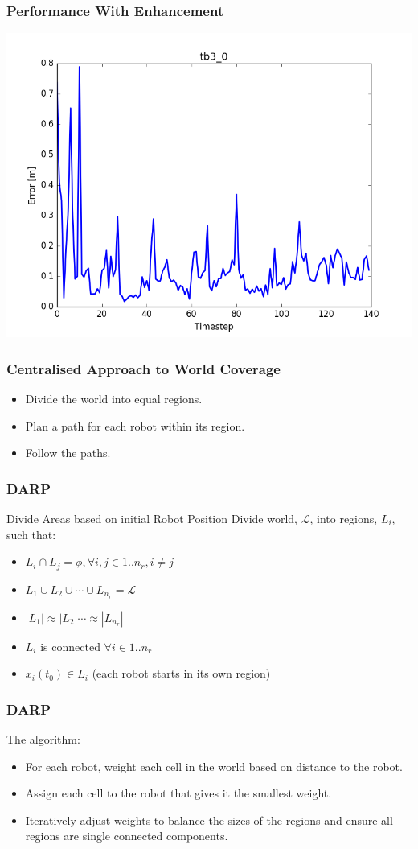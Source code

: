 \documentclass{beamer}
\begin{document}
	\begin{frame}
		\frametitle{Performance With Enhancement}
		\includegraphics[width=\columnwidth]{figure_l1.png}
	\end{frame}
	\begin{frame}
		\frametitle{Centralised Approach to World Coverage}
		\pause
		\begin {itemize}
			\item<2-> Divide the world into equal regions.
			\item<3-> Plan a path for each robot within its region.
			\item<4-> Follow the paths.	
		\end {itemize}
	\end{frame}
	\begin{frame}
		\frametitle{DARP}
		Divide Areas based on initial Robot Position
		Divide world, $\mathcal{L}$, into regions, $L_i$, such that:
		\begin{itemize}
			\item<2-> $L_i \cap L_j = \phi, \forall i, j  \in 1..n_r, i \neq j$
			\item<3-> $L_1 \cup L_2 \cup \cdots \cup L_{n_r} = \mathcal{L}$
			\item<4-> $|L_1| \approx |L_2| \cdots \approx |L_{n_r}|$
			\item<5-> $L_i$ is connected $\forall i\in 1..n_r$
			\item<6-> $x_i(t_0) \in L_i$ (each robot starts in its own region)
		\end{itemize}
	\end{frame}

	\begin{frame}
		\frametitle{DARP}
		The algorithm:
		\begin{itemize}
			\item<2-> For each robot, weight each cell in the world based on distance to the robot.
			\item<3-> Assign each cell to the robot that gives it the smallest weight.
			\item<4-> Iteratively adjust weights to balance the sizes of the regions and ensure all regions are single connected components.
		\end{itemize}
	
	\end{frame}
\end{document}
